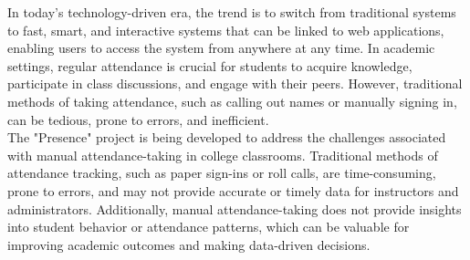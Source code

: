 In today's technology-driven era, the trend is to switch from traditional systems to fast, smart, and interactive systems that can be linked to web applications, enabling users to access the system from anywhere at any time. In academic settings, regular attendance is crucial for students to acquire knowledge, participate in class discussions, and engage with their peers. However, traditional methods of taking attendance, such as calling out names or manually signing in, can be tedious, prone to errors, and inefficient.\\

The "Presence" project is being developed to address the challenges associated with manual attendance-taking in college classrooms. Traditional methods of attendance tracking, such as paper sign-ins or roll calls, are time-consuming, prone to errors, and may not provide accurate or timely data for instructors and administrators. Additionally, manual attendance-taking does not provide insights into student behavior or attendance patterns, which can be valuable for improving academic outcomes and making data-driven decisions.